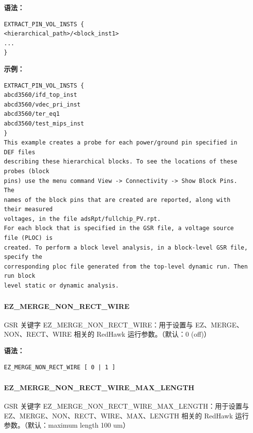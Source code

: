 \textbf{语法：}
\begin{lstlisting}
EXTRACT_PIN_VOL_INSTS {
<hierarchical_path>/<block_inst1>
...
}
\end{lstlisting}

\textbf{示例：}
\begin{lstlisting}
EXTRACT_PIN_VOL_INSTS {
abcd3560/ifd_top_inst
abcd3560/vdec_pri_inst
abcd3560/ter_eq1
abcd3560/test_mips_inst
}
This example creates a probe for each power/ground pin specified in DEF files
describing these hierarchical blocks. To see the locations of these probes (block
pins) use the menu command View -> Connectivity -> Show Block Pins. The
names of the block pins that are created are reported, along with their measured
voltages, in the file adsRpt/fullchip_PV.rpt.
For each block that is specified in the GSR file, a voltage source file (PLOC) is
created. To perform a block level analysis, in a block-level GSR file, specify the
corresponding ploc file generated from the top-level dynamic run. Then run block
level static or dynamic analysis.
\end{lstlisting}

\subsubsection{}
\paragraph*{EZ_MERGE_NON_RECT_WIRE}

GSR 关键字 EZ_MERGE_NON_RECT_WIRE：用于设置与 EZ、MERGE、NON、RECT、WIRE 相关的 RedHawk 运行参数。（默认：0 (off)）

\textbf{语法：}
\begin{lstlisting}
EZ_MERGE_NON_RECT_WIRE [ 0 | 1 ]
\end{lstlisting}

\subsubsection{}
\paragraph*{EZ_MERGE_NON_RECT_WIRE_MAX_LENGTH}

GSR 关键字 EZ_MERGE_NON_RECT_WIRE_MAX_LENGTH：用于设置与 EZ、MERGE、NON、RECT、WIRE、MAX、LENGTH 相关的 RedHawk 运行参数。（默认：maximum length 100 um）

